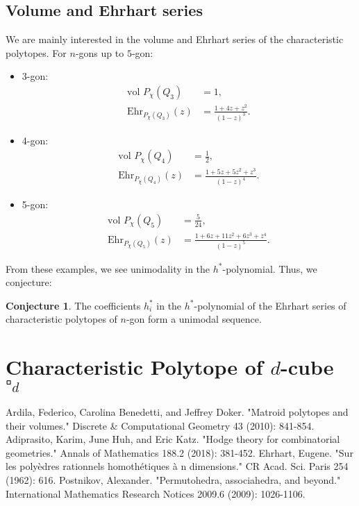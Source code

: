 \documentclass[12pt]{article}
\theoremstyle{definition}
\newtheorem{conj}[thm]{Conjecture}
\numberwithin{equation}{subsection}
\begin{document}
\subsection{Volume and Ehrhart series}
We are mainly interested in the volume and Ehrhart series of the characteristic polytopes. For $n$-gons up to $5$-gon:
\begin{itemize}
    \item 3-gon: 
    \begin{align*}
        \text{vol }P_{\chi}(Q_3) &= 1, \\
        \text{Ehr}_{P_{\chi}(Q_3)}(z) &= \frac{1 + 4z + z^2}{(1 - z)^3}.
    \end{align*}
    \item 4-gon: 
    \begin{align*}
        \text{vol }P_{\chi}(Q_4) &= \frac{1}{2}, \\
        \text{Ehr}_{P_{\chi}(Q_4)}(z) &= \frac{1 + 5z + 5z^2 + z^3}{(1 - z)^4}.
    \end{align*}
    \item 5-gon:
    \begin{align*}
        \text{vol }P_{\chi}(Q_5) &= \frac{5}{24}, \\
        \text{Ehr}_{P_{\chi}(Q_5)}(z) &= \frac{1 + 6z + 11z^2 + 6z^3 + z^4}{(1 - z)^5}.
    \end{align*}
\end{itemize}

From these examples, we see unimodality in the $h^*$-polynomial. Thus, we conjecture:
\begin{conj}
    The coefficients $h^*_{i}$ in the $h^*$-polynomial of the Ehrhart series of characteristic polytopes of $n$-gon form a unimodal sequence.
\end{conj}

\section{Characteristic Polytope of $d$-cube $\square_{d}$}

\begin{thebibliography}{99}
     Ardila, Federico, Carolina Benedetti, and Jeffrey Doker. "Matroid polytopes and their volumes." Discrete \& Computational Geometry 43 (2010): 841-854.
     Adiprasito, Karim, June Huh, and Eric Katz. "Hodge theory for combinatorial geometries." Annals of Mathematics 188.2 (2018): 381-452.
     Ehrhart, Eugene. "Sur les polyèdres rationnels homothétiques à n dimensions." CR Acad. Sci. Paris 254 (1962): 616.
     Postnikov, Alexander. "Permutohedra, associahedra, and beyond." International Mathematics Research Notices 2009.6 (2009): 1026-1106.
\end{thebibliography}
\end{document}
